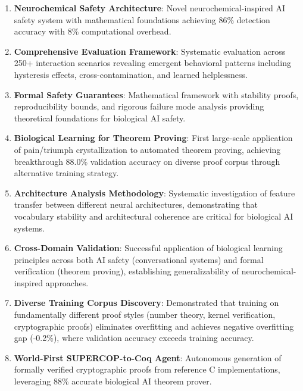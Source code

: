 \documentclass[12pt]{article}
\begin{document}
\begin{enumerate}
\item \textbf{Neurochemical Safety Architecture}: Novel neurochemical-inspired AI safety system with mathematical foundations achieving 86\% detection accuracy with 8\% computational overhead.

\item \textbf{Comprehensive Evaluation Framework}: Systematic evaluation across 250+ interaction scenarios revealing emergent behavioral patterns including hysteresis effects, cross-contamination, and learned helplessness.

\item \textbf{Formal Safety Guarantees}: Mathematical framework with stability proofs, reproducibility bounds, and rigorous failure mode analysis providing theoretical foundations for biological AI safety.

\item \textbf{Biological Learning for Theorem Proving}: First large-scale application of pain/triumph crystallization to automated theorem proving, achieving breakthrough 88.0\% validation accuracy on diverse proof corpus through alternative training strategy.

\item \textbf{Architecture Analysis Methodology}: Systematic investigation of feature transfer between different neural architectures, demonstrating that vocabulary stability and architectural coherence are critical for biological AI systems.

\item \textbf{Cross-Domain Validation}: Successful application of biological learning principles across both AI safety (conversational systems) and formal verification (theorem proving), establishing generalizability of neurochemical-inspired approaches.

\item \textbf{Diverse Training Corpus Discovery}: Demonstrated that training on fundamentally different proof styles (number theory, kernel verification, cryptographic proofs) eliminates overfitting and achieves negative overfitting gap (-0.2\%), where validation accuracy exceeds training accuracy.

\item \textbf{World-First SUPERCOP-to-Coq Agent}: Autonomous generation of formally verified cryptographic proofs from reference C implementations, leveraging 88\% accurate biological AI theorem prover.
\end{enumerate}
\end{document}
